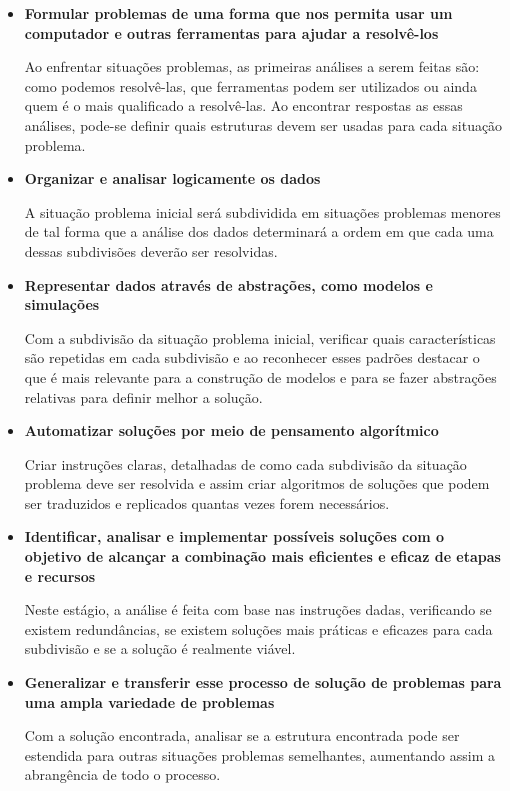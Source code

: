 \documentclass[12pt, openright, a4paper, brazil, openany, oneside]{abntex2}
\begin{document}
\begin{itemize}
\item \textbf{Formular problemas de uma forma que nos permita usar um computador e outras ferramentas para ajudar a resolvê-los}

Ao enfrentar situações problemas, as primeiras análises a serem feitas são: como podemos resolvê-las, que ferramentas podem ser utilizados ou ainda quem é o mais qualificado a resolvê-las. Ao encontrar respostas as essas análises, pode-se definir quais estruturas devem ser usadas para cada situação problema.

\item \textbf{Organizar e analisar logicamente os dados}

A situação problema inicial será subdividida em situações problemas menores de tal forma que a análise dos dados determinará a ordem em que cada uma dessas subdivisões deverão ser resolvidas.

\item \textbf{Representar dados através de abstrações, como modelos e simulações}

Com a subdivisão da situação problema inicial, verificar quais características são repetidas em cada subdivisão e ao reconhecer esses padrões destacar o que é mais relevante para a construção de modelos e para se fazer abstrações relativas para definir melhor a solução.

\item \textbf{Automatizar soluções por meio de pensamento algorítmico}

Criar instruções claras, detalhadas de como cada subdivisão da situação problema deve ser resolvida e assim criar algoritmos de soluções que podem ser traduzidos e replicados quantas vezes forem necessários.

\item \textbf{Identificar, analisar e implementar possíveis soluções com o objetivo de alcançar a combinação mais eficientes e eficaz de etapas e recursos}

Neste estágio, a análise é feita com base nas instruções dadas, verificando se existem redundâncias, se existem soluções mais práticas e eficazes para cada subdivisão e se a solução é realmente viável.

\item \textbf{Generalizar e transferir esse processo de solução de problemas para uma ampla variedade de problemas}

Com a solução encontrada, analisar se a estrutura encontrada pode ser estendida para outras situações problemas semelhantes, aumentando assim a abrangência de todo o processo.

\end{itemize}
\end{document}

